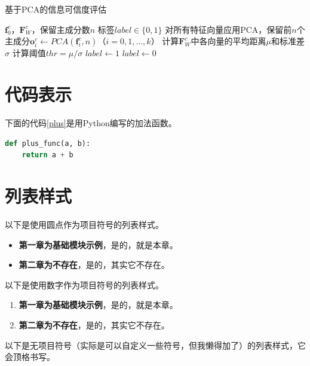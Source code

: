 \documentclass[a4paper,AutoFakeBold,oneside,12pt]{book}
\begin{document}
{{\begin{algorithm} 
\caption{基于PCA的信息可信度评估} 
\label{PCA_model}
\renewcommand{\algorithmicrequire}{\textbf{输入：}}
\renewcommand{\algorithmicensure}{\textbf{输出：}} 
	\begin{algorithmic}[1] 
	\Require $\bm{f}^{c}_{0}$，$\bm{F}^{c}_{W}$，保留主成分数$n$
	\Ensure 标签$label\in \{0,1\}$
	\State 对所有特征向量应用PCA，保留前$n$个主成分$\bm{o}^{c}_{i} \gets PCA(\bm{f}^{c}_{i}, n)$（$i = 0,1,\ldots,k$）
	\State 计算$\bm{F}^{c}_{W}$中各向量的平均距离$\mu$和标准差$\sigma$
	\State 计算阈值$thr = {\mu} / {\sigma}$
		\State $ label \gets 1 $
	\Else
		\State $ label \gets 0 $
	\EndIf
	\end{algorithmic}
\end{algorithm}

\section{代码表示}
下面的代码\ref{plus}是用Python编写的加法函数。

\begin{lstlisting}[language=Python, caption=加法, label=plus, tabsize=2]  
def plus_func(a, b):
	return a + b
\end{lstlisting}  

\section{列表样式}

以下是使用圆点作为项目符号的列表样式。

\begin{itemize}
\item \textbf{第一章为基础模块示例}，是的，就是本章。
\item \textbf{第二章为不存在}，是的，其实它不存在。
\end{itemize}

以下是使用数字作为项目符号的列表样式。

\begin{enumerate}
\item \textbf{第一章为基础模块示例}，是的，就是本章。
\item \textbf{第二章为不存在}，是的，其实它不存在。
\end{enumerate}

以下是无项目符号（实际是可以自定义一些符号，但我懒得加了）的列表样式，它会顶格书写。

}}
\end{document}
